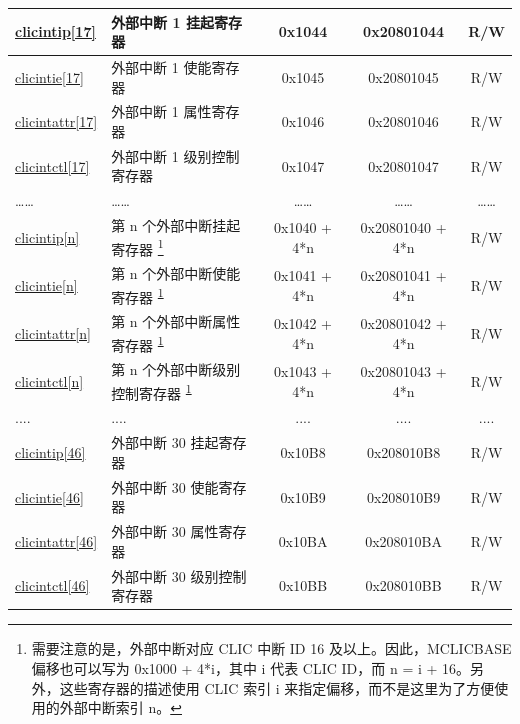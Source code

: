 \begin{longtable}{ | p{1.8cm} | p{7.5cm} | c | c | c | }
\hyperref[regdesc:MCLICINTIP_REG_i]{clicintip[17]} & 外部中断 1 挂起寄存器 & 0x1044 & 0x20801044 & R/W \\\hline
\hyperref[regdesc:MCLICINTIE_REG_i]{clicintie[17]} & 外部中断 1 使能寄存器 & 0x1045 & 0x20801045 & R/W \\\hline
\hyperref[regdesc:MCLICINTATTR_REG_i]{clicintattr[17]} & 外部中断 1 属性寄存器 & 0x1046 & 0x20801046 & R/W \\\hline
\hyperref[regdesc:MCLICINTCTL_REG_i]{clicintctl[17]} & 外部中断 1 级别控制寄存器 & 0x1047 & 0x20801047 & R/W \\\hline

…… & …… & …… & …… & …… \\\hline

\hyperref[regdesc:MCLICINTIP_REG_i]{clicintip[n]} & 第 n 个外部中断挂起寄存器 \footnote{\label{note_mclic_index}需要注意的是，外部中断对应 CLIC 中断 ID 16 及以上。因此，MCLICBASE 偏移也可以写为 0x1000 + 4*i，其中 i 代表 CLIC ID，而 n = i + 16。另外，这些寄存器的描述使用 CLIC 索引 i 来指定偏移，而不是这里为了方便使用的外部中断索引 n。} & 0x1040 + 4*n & 0x20801040 + 4*n & R/W \\\hline
\hyperref[regdesc:MCLICINTIE_REG_i]{clicintie[n]} & 第 n 个外部中断使能寄存器 \textsuperscript{\ref{note_mclic_index}} & 0x1041 + 4*n & 0x20801041 + 4*n & R/W \\\hline
\hyperref[regdesc:MCLICINTATTR_REG_i]{clicintattr[n]} & 第 n 个外部中断属性寄存器 \textsuperscript{\ref{note_mclic_index}} & 0x1042 + 4*n & 0x20801042 + 4*n & R/W \\\hline
\hyperref[regdesc:MCLICINTCTL_REG_i]{clicintctl[n]} & 第 n 个外部中断级别控制寄存器 \textsuperscript{\ref{note_mclic_index}} & 0x1043 + 4*n & 0x20801043 + 4*n & R/W \\\hline

.... & .... & .... & .... & .... \\\hline

\hyperref[regdesc:MCLICINTIP_REG_i]{clicintip[46]} & 外部中断 30 挂起寄存器 & 0x10B8 & 0x208010B8 & R/W \\\hline
\hyperref[regdesc:MCLICINTIE_REG_i]{clicintie[46]} & 外部中断 30 使能寄存器 & 0x10B9 & 0x208010B9 & R/W \\\hline
\hyperref[regdesc:MCLICINTATTR_REG_i]{clicintattr[46]} & 外部中断 30 属性寄存器 & 0x10BA & 0x208010BA & R/W \\\hline
\hyperref[regdesc:MCLICINTCTL_REG_i]{clicintctl[46]} & 外部中断 30 级别控制寄存器 & 0x10BB & 0x208010BB & R/W \\\hline


\end{longtable}
